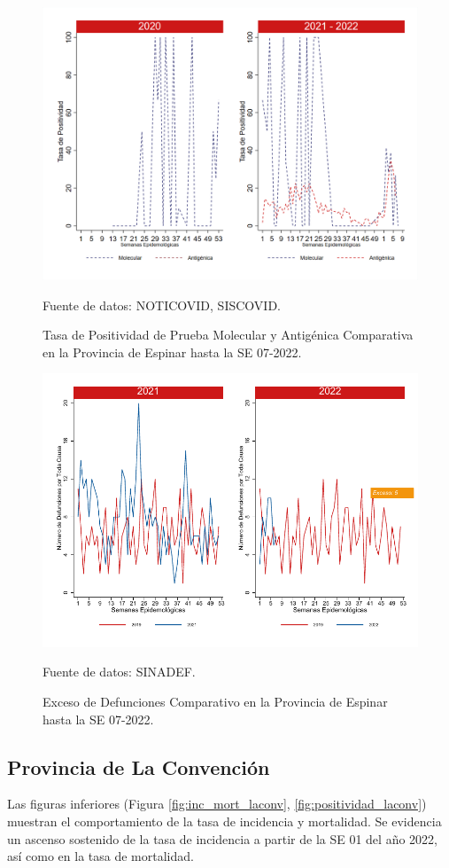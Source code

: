 \documentclass[12pt,a4paper,openany]{book}
\begin{document}
		\begin{figure}[h]
			\caption{Tasa de Positividad de Prueba Molecular y Antigénica Comparativa en la Provincia de Espinar hasta la SE 07-2022.}\label{fig:positividad_espinar}
			\begin{center}
				\includegraphics[width=0.7\linewidth]{../figuras/positividad_20_21_8.png}
			\end{center}
			{\footnotesize {Fuente de datos: NOTICOVID, SISCOVID.}}
		\end{figure}
		
		\begin{figure}[h]
			\caption{Exceso de Defunciones Comparativo en la Provincia de Espinar hasta la SE 07-2022.}\label{fig:exceso_espinar}
			\begin{center}
				\includegraphics[width=0.7\linewidth]{../figuras/exceso_8.pdf}
			\end{center}
			{\footnotesize {Fuente de datos: SINADEF.}}
		\end{figure}
		
		\clearpage
		
		\subsection*{Provincia de La Convención}
		\noindent Las figuras inferiores (Figura \ref{fig:inc_mort_laconv}, \ref{fig:positividad_laconv}) muestran el comportamiento de la tasa de incidencia y mortalidad. Se evidencia un ascenso sostenido de la tasa de incidencia a partir de la SE 01 del año 2022, así como en la tasa de mortalidad. 
\end{document}
